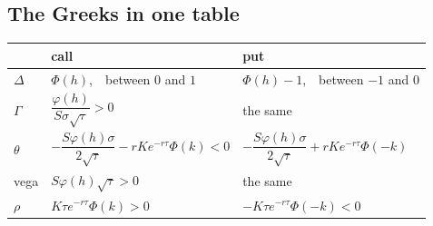 \subsection*{The Greeks in one table}
\begin{center}\renewcommand{\arraystretch}{2.1}
\begin{tabular}{@{}l|l|l@{}}
 & call & put\\\hline
$\Delta$ & $\Phi(h)$,\ \ between $0$ and $1$ & $\Phi(h)-1$,\ \ between $-1$ and $0$\\
$\Gamma$ & $\dfrac{\varphi(h)}{S\sigma\sqrt\tau}>0$ & the same\\
$\theta$ & $-\dfrac{S\varphi(h)\sigma}{2\sqrt\tau}-rKe^{-r\tau}\Phi(k)<0$ & $-\dfrac{S\varphi(h)\sigma}{2\sqrt\tau}+rKe^{-r\tau}\Phi(-k)$\\
vega & $S\varphi(h)\sqrt\tau>0$ & the same\\
$\rho$ & $K\tau e^{-r\tau}\Phi(k)>0$ & $-K\tau e^{-r\tau}\Phi(-k)<0$\\
\end{tabular}
\end{center}

